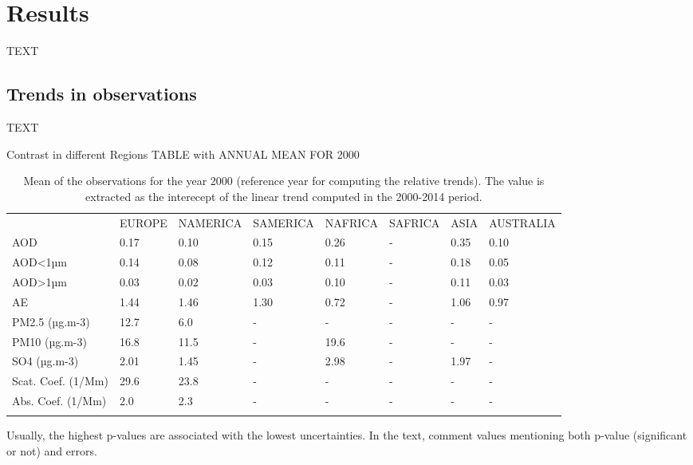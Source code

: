 \documentclass[journal abbreviation, manuscript]{copernicus}
\begin{document}
\section{Results}
TEXT


\subsection{Trends in observations}
TEXT

Contrast in different Regions
TABLE with ANNUAL MEAN FOR 2000

\begin{table}
 \begin{tabular}{llllllll}
  \tophline
                     & EUROPE & NAMERICA & SAMERICA & NAFRICA & SAFRICA & ASIA & AUSTRALIA \\
  \middlehline
  AOD                & 0.17   & 0.10     & 0.15     & 0.26    & -       & 0.35 & 0.10      \\
  AOD<1µm            & 0.14   & 0.08     & 0.12     & 0.11    & -       & 0.18 & 0.05      \\
  AOD>1µm            & 0.03   & 0.02     & 0.03     & 0.10    & -       & 0.11 & 0.03      \\
  AE                 & 1.44   & 1.46     & 1.30     & 0.72    & -       & 1.06 & 0.97      \\
  PM2.5 (µg.m-3)     & 12.7   & 6.0      & -        & -       & -       & -    & -         \\
  PM10 (µg.m-3)      & 16.8   & 11.5     & -        & 19.6    & -       & -    & -         \\
  SO4 (µg.m-3)       & 2.01   & 1.45     & -        & 2.98    & -       & 1.97 & -         \\
  Scat. Coef. (1/Mm) & 29.6   & 23.8     & -        & -       & -       & -    & -         \\
  Abs. Coef. (1/Mm)  & 2.0    & 2.3      & -        & -       & -       & -    & -         \\
  \bottomhline
 \end{tabular}

 \caption{Mean of the observations for the year 2000 (reference year for computing the relative trends). The value is extracted as the interecept of the linear trend computed in the 2000-2014 period.}
 \label{meanobs_2000}
\end{table}


Usually, the highest p-values are associated with the lowest uncertainties.
In the text, comment values mentioning both p-value (significant or not) and errors.
\end{document}
